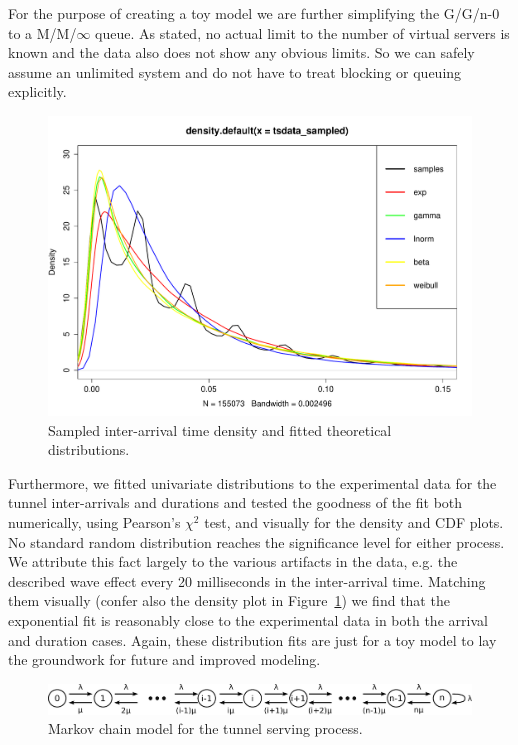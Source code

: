 For the purpose of creating a toy model we are further simplifying the G/G/n-0 to a M/M/$\infty$ queue. As stated, no actual limit to the number of virtual servers is known and the data also does not show any obvious limits. So we can safely assume an unlimited system and do not have to treat blocking or queuing explicitly.

\begin{figure}
	\centering
	\includegraphics[width=\columnwidth]{images/IMC2013/R-IAT-densities.pdf}
	\caption{Sampled inter-arrival time density and fitted theoretical distributions.}
	\label{fig:IAT-densities}
\end{figure}

Furthermore, we fitted univariate distributions to the experimental data for the tunnel inter-arrivals and durations and tested the goodness of the fit both numerically, using Pearson's $\chi^2$ test, and visually for the density and CDF plots. No standard random distribution reaches the significance level for either process. We attribute this fact largely to the various artifacts in the data, e.g. the described wave effect every 20 milliseconds in the inter-arrival time. Matching them visually (confer also the density plot in Figure~\ref{fig:IAT-densities}) we find that the exponential fit is reasonably close to the experimental data in both the arrival and duration cases. Again, these distribution fits are just for a toy model to lay the groundwork for future and improved modeling.


\begin{figure}
	\centering
	\includegraphics[width=\columnwidth]{images/IMC2013/markovchain.pdf}
	\caption{Markov chain model for the tunnel serving process.}
	\label{fig:markovchain}
\end{figure}

